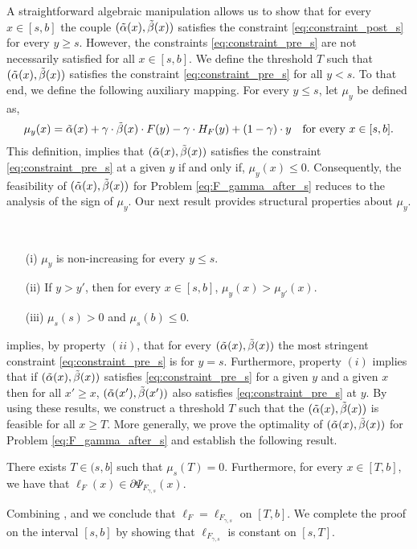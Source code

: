 A straightforward algebraic manipulation allows us to show that for every $x \in [s,b]$ the couple $(\aFs,\bFs)$ satisfies the constraint \eqref{eq:constraint_post_s} for every $y \geq s$.
However, the constraints \eqref{eq:constraint_pre_s} are not necessarily satisfied for all $x \in [s,b]$. We define the threshold $T$ such that $(\aFs,\bFs)$ satisfies the constraint \eqref{eq:constraint_pre_s} for all $y < s$.  
To that end, we define the following auxiliary mapping. For every $y \leq s$, let $\mu_y$ be defined as,
\begin{equation*}
\mu_y(x) = \aFs + \gamma \cdot \bFs \cdot F(y) - \gamma \cdot H_{F}(y) + (1-\gamma) \cdot y \quad \text{for every $x \in [s,b]$.}
\end{equation*}
This definition, implies that $(\aFs,\bFs)$ satisfies the constraint \eqref{eq:constraint_pre_s} at a given $y$ if and only if, $\mu_{y}(x) \leq 0$.  Consequently, the feasibility of $(\aFs,\bFs)$ for Problem \eqref{eq:F_gamma_after_s} reduces to the analysis of the sign of $\mu_y$. Our next result provides structural properties about $\mu_y$.
\begin{lemma}\label{lem:prop_mu}
\,
\begin{enumerate}
\item[(i)] $\mu_y$ is non-increasing for every $y \leq s$.
\item[(ii)] If $y > y'$, then for every $x \in [s,b]$, $\mu_{y}(x) > \mu_{y'}(x)$.
\item[(iii)] $\mu_s(s) > 0$ and $\mu_s(b) \leq 0$.
\end{enumerate}
\end{lemma}
 implies, by property $(ii)$, that for every $(\aFs,\bFs)$ the most stringent constraint \eqref{eq:constraint_pre_s}  is for $y =s$. Furthermore, property $(i)$ implies that if $(\aFs,\bFs)$ satisfies \eqref{eq:constraint_pre_s} for a given $y$ and a given $x$ then for all $x' \geq x$, $(\aFs[x'],\bFs[x'])$ also satisfies \eqref{eq:constraint_pre_s} at $y$. By using these results, we construct a threshold $T$ such that the $(\aFs,\bFs)$ is feasible for all $x \geq T$. More generally, we prove the optimality of $(\aFs,\bFs)$ for Problem \eqref{eq:F_gamma_after_s} and establish the following result.
\begin{lemma}
\label{prop:from_F_to_feasible_Fs}
There exists $T \in (s,b]$ such that $\mu_s(T) = 0$. Furthermore, for every $x \in [T,b]$, we have that $\ell_{F}(x) \in \partial \Psi_{F_{\gamma,s}}(x)$.
\end{lemma}
Combining ,  and  we conclude that $\ell_F = \ell_{F_{\gamma,s}}$ on $[T,b]$. We complete the proof on the interval $[s,b]$ by showing that $\ell_{F_{\gamma,s}}$ is constant on $[s,T]$.\\

